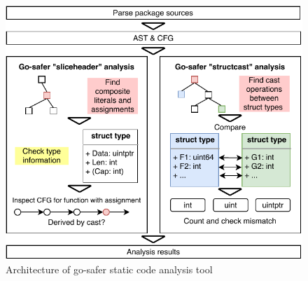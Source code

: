 \begin{figure}[t!] %
    \centering
    \includegraphics[width=\textwidth]{assets/figures/go-safer-architecture.pdf}
    \caption{Architecture of go-safer static code analysis tool}
    \label{fig:safer-architecture}
\end{figure}
